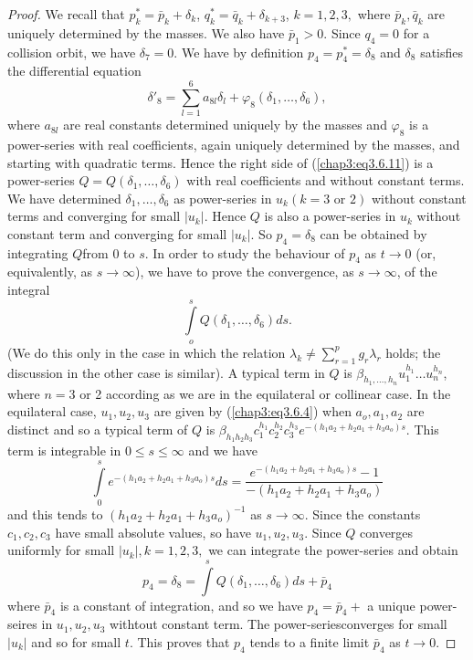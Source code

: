 \begin{proof}
We recall that $p^*_k = \bar{p}_k + \delta_k$, $q^*_k = \bar{q}_k+
\delta_{k+3}$, $k=1,2,3,$ where $\bar{p}_k, \bar{q}_k$ are uniquely
determined by the masses. We also have $\bar{p}_1 > 0$. Since $q_4 =0$
for a collision orbit, we have $\delta_7 = 0$. We have by definition
$p_4 = p^*_4= \delta_8$ and $\delta_8$ satisfies the differential
equation 
\begin{equation*}
\delta'_8 = \sum\limits^6_{l=1} a_{8l} \delta_l+ \varphi_8 (\delta_1,
\ldots, \delta_6),  
\tag{3.6.11}\label{chap3:eq3.6.11}
\end{equation*}
where $a_{8l}$ are real constants determined uniquely by the masses
and $\varphi_8$ is a power-series with real coefficients, again
uniquely determined by the masses, and starting with quadratic
terms. Hence the right side of (\ref{chap3:eq3.6.11}) is a
power-series $Q= Q(\delta_1, \ldots, \delta_6)$ with real coefficients
and without constant terms. We have determined $\delta_1,
\ldots,\delta_6$ as power-series in $u_k (k=3 \text{ or }2)$ without
constant terms and converging for small $|u_k|$. Hence $Q$ is also a
power-series in $u_k$ without constant term and converging for small
$|u_k|$. So $p_4 = \delta_8$ can be obtained by integrating
$Q$\pageoriginale from 0 to $s$. In order to study the behaviour of
$p_4$ as $t \to 0$ (or, equivalently, as $s \to \infty$), we have to
prove the convergence, as $s \to \infty$, of the integral 
$$
\int\limits^s_o Q (\delta_1, \ldots, \delta_6) ds.
$$
(We do this only in the case in which the relation $\lambda_k \neq
\sum\limits^p_{r=1} g_r \lambda_r$ holds; the discussion in the other
case is similar). A typical term in $Q$ is $\beta_{h_1, \ldots, h_n}
u^{h_1}_1 \ldots u^{h_n}_n$, where $n=3$ or 2 according as we are in
the equilateral or collinear case. In the equilateral case, $u_1, u_2,
u_3$ are given by (\ref{chap3:eq3.6.4}) when $a_o, a_1, a_2$ are
distinct and so a typical term of $Q$ is $\beta_{h_1 h_2 h_3}
c^{h_1}_1 c^{h_2}_2 c^{h_3}_3 e^{-(h_1 a_2 + h_2 a_1 + h_3
  a_o)s}$. This term is integrable in $0 \leq s \leq \infty$ and we
have 
$$
\int\limits^s_0 e^{-(h_1a_2 + h_2 a_1+ h_3 a_o)s} ds = \frac{e^{-(h_1
    a_2 + h_2 a_1 + h_3 a_o)s}-1}{-(h_1 a_2+ h_2 a_1 + h_3 a_o)} 
$$
and this tends to $(h_1 a_2 + h_2 a_1+ h_3 a_o)^{-1}$ as $s \to
\infty$. Since the constants $c_1, c_2, c_3$ have small absolute
values, so have $u_1, u_2, u_3$. Since $Q$ converges uniformly for
small $|u_k|, k =1,2, 3,$ we can integrate the power-series and obtain 
$$
p_4 = \delta_8 = \int\limits^s Q (\delta_1, \ldots, \delta_6) ds + \bar{p}_4
$$
where $\bar{p}_4$ is a constant of integration, and so we have $p_4 =
\bar{p}_4 + $ a unique power-seires in $u_1, u_2, u_3$ withtout
constant term. The power-series\pageoriginale converges for small
$|u_k|$ and so for small $t$. This proves that $p_4$ tends to a finite
limit $\bar{p}_4$ as $t \to 0$. 


\end{proof}
